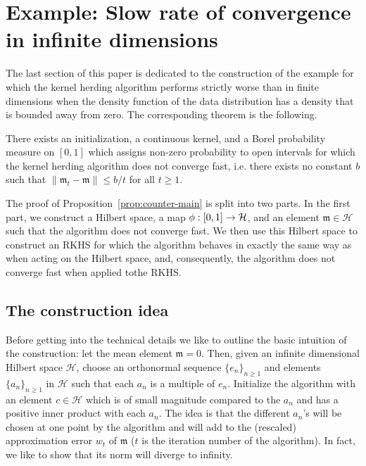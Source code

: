 \documentclass[AHL,Unicode,longabstracts,published]{cedram}
\theoremstyle{remark}
\newcommand{\cH}{\mathcal{H}}
\newcommand{\mean}{\mathfrak{m}}
\renewcommand*{\to}{\mathchoice{\longrightarrow}{\rightarrow}{\rightarrow}{\rightarrow}}
\begin{document}
\section{Example: Slow rate of convergence in infinite dimensions}

The last section of this paper is dedicated to the construction of the example for which the kernel herding algorithm performs strictly worse than in finite dimensions when the density function of the data distribution has a density that is bounded away from zero. The corresponding theorem is the following.

\begin{theo}\label{prop:counter-main}
There exists an initialization, a continuous kernel, and a Borel probability measure on $[0,1]$ which assigns non-zero probability to open intervals for which the kernel herding algorithm does not converge fast, i.e. there exists no constant $b$ such that $\|\mean_t- \mean \| \leq b/t$ for all $t \geq 1$.
\end{theo}

The proof of Proposition~\ref{prop:counter-main} is split into two parts. In the first part, we construct a Hilbert space, a map $\phi: [0,1]\to \cH$, and an element $\mean \in \cH$ such that the algorithm does not converge fast. We then use this Hilbert space to construct an RKHS for which the algorithm behaves in exactly the same way as when acting on the Hilbert space, and, consequently, the algorithm does not converge fast when applied to\linebreak the RKHS.


\subsection*{The construction idea}

Before getting into the technical details we like to outline the basic intuition of the construction: let the mean element $\mean = 0$. Then, given an infinite dimensional Hilbert space $\cH$, choose an orthonormal sequence $\{e_n\}_{n\geq 1}$ and elements $\{a_n\}_{n\geq 1}$ in $\cH$ such that each $a_n$ is a multiple of $e_n$. Initialize the algorithm with an element $c \in \cH$ which is of small magnitude compared to the $a_n$ and has a positive inner product with each $a_n$. The idea is that the different $a_n$'s will be chosen at one point by the algorithm and will add to the (rescaled) approximation error $w_t$ of $\mean$ ($t$ is the iteration number of the algorithm). In fact, we like to show that its norm will diverge to infinity.
\end{document}
